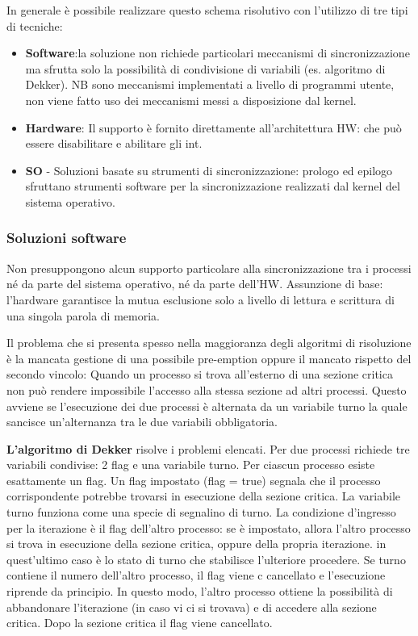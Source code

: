 \documentclass{article}
\begin{document}
In generale è possibile realizzare questo schema risolutivo con l'utilizzo di tre tipi di tecniche:
\begin{itemize}
    \item \textbf{Software}:la soluzione non richiede particolari meccanismi di sincronizzazione ma sfrutta solo la possibilità di 
    condivisione di variabili (es. algoritmo di Dekker). NB sono meccanismi implementati a livello di programmi utente, non viene fatto
    uso dei meccanismi messi a disposizione dal kernel.
    \item \textbf{Hardware}: Il supporto è fornito direttamente all'architettura HW: che può essere disabilitare e abilitare gli int.
    \item \textbf{SO} - Soluzioni basate su strumenti di sincronizzazione: prologo ed epilogo sfruttano strumenti software per la sincronizzazione
     realizzati dal kernel del sistema operativo. 
\end{itemize}

\subsubsection{Soluzioni software}
\noindent Non presuppongono alcun supporto particolare alla sincronizzazione tra i processi né da parte
del sistema operativo, né da parte dell'HW. Assunzione di base: l'hardware garantisce la
mutua esclusione solo a livello di lettura e scrittura di una singola parola di memoria.

\noindent Il problema che si presenta spesso nella maggioranza degli algoritmi di risoluzione è la mancata gestione di una possibile 
pre-emption oppure il mancato rispetto del secondo vincolo: Quando un processo si trova all'esterno di una sezione critica non può rendere 
impossibile l'accesso alla stessa sezione ad altri processi. Questo avviene se l'esecuzione dei due processi è alternata da un variabile 
turno la quale sancisce un'alternanza tra le due variabili obbligatoria.
\medskip

\noindent \textbf{L'algoritmo di Dekker} risolve i problemi elencati. Per due processi richiede tre variabili condivise: 2 flag e una variabile turno. 
Per ciascun processo esiste esattamente un flag. Un flag impostato (flag = true) segnala che il processo corrispondente potrebbe trovarsi
 in esecuzione della sezione critica. La variabile turno funziona come una specie di segnalino di turno. La condizione d'ingresso per
 la iterazione è il flag dell'altro processo: se è impostato, allora l'altro processo si trova in esecuzione della sezione critica, oppure della propria iterazione.
 in quest'ultimo caso è lo stato di turno che stabilisce l'ulteriore procedere. Se turno contiene il numero dell'altro processo, il flag viene c
 cancellato e l'esecuzione riprende da principio. In questo modo, l'altro processo ottiene la possibilità di abbandonare l'iterazione 
 (in caso vi ci si trovava) e di accedere alla sezione critica. Dopo la sezione critica il flag viene cancellato. 
\end{document}
